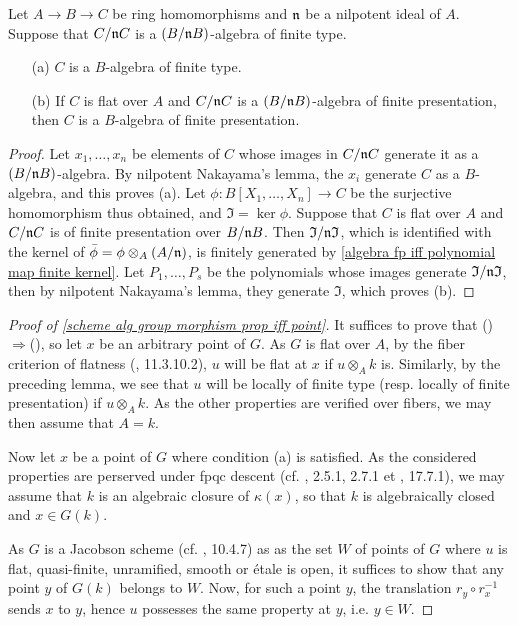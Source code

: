 \begin{lemma}\label{ring homomorphism ft and fp after nilpotent quotient}
Let $A\to B\to C$ be ring homomorphisms and $\mathfrak{n}$ be a nilpotent ideal of $A$. Suppose that $C/\mathfrak{n} C$ is a $(B/\mathfrak{n} B)$-algebra of finite type.
\begin{enumerate}
    \item[(a)] $C$ is a $B$-algebra of finite type.
    \item[(b)] If $C$ is flat over $A$ and $C/\mathfrak{n} C$ is a $(B/\mathfrak{n} B)$-algebra of finite presentation, then $C$ is a $B$-algebra of finite presentation.
\end{enumerate}
\end{lemma}
\begin{proof}
Let $x_1,\dots,x_n$ be elements of $C$ whose images in $C/\mathfrak{n} C$ generate it as a $(B/\mathfrak{n} B)$-algebra. By nilpotent Nakayama's lemma, the $x_i$ generate $C$ as a $B$-algebra, and this proves (a). Let $\phi:B[X_1,\dots,X_n]\to C$ be the surjective homomorphism thus obtained, and $\mathfrak{I}=\ker\phi$. Suppose that $C$ is flat over $A$ and $C/\mathfrak{n} C$ is of finite presentation over $B/\mathfrak{n} B$. Then $\mathfrak{I}/\mathfrak{n}\mathfrak{I}$, which is identified with the kernel of $\bar{\phi}=\phi\otimes_A(A/\mathfrak{n})$, is finitely generated by \cref{algebra fp iff polynomial map finite kernel}. Let $P_1,\dots,P_s$ be the polynomials whose images generate $\mathfrak{I}/\mathfrak{n}\mathfrak{I}$, then by nilpotent Nakayama's lemma, they generate $\mathfrak{I}$, which proves (b).
\end{proof}

\begin{proof}[Proof of \cref{scheme alg group morphism prop iff point}]
It suffices to prove that ()$\Rightarrow$(), so let $x$ be an arbitrary point of $G$. As $G$ is flat over $A$, by the fiber criterion of flatness (\cite{EGA4-3}, 11.3.10.2), $u$ will be flat at $x$ if $u\otimes_Ak$ is. Similarly, by the preceding lemma, we see that $u$ will be locally of finite type (resp. locally of finite presentation) if $u\otimes_Ak$. As the other properties are verified over fibers, we may then assume that $A=k$.\par
Now let $x$ be a point of $G$ where condition (a) is satisfied. As the considered properties are perserved under fpqc descent (cf. \cite{EGA4-2}, 2.5.1, 2.7.1 et \cite{EGA4-4}, 17.7.1), we may assume that $k$ is an algebraic closure of $\kappa(x)$, so that $k$ is algebraically closed and $x\in G(k)$.\par
As $G$ is a Jacobson scheme (cf. \cite{EGA4-3}, 10.4.7) as as the set $W$ of points of $G$ where $u$ is flat, quasi-finite, unramified, smooth or \'etale is open, it suffices to show that any point $y$ of $G(k)$ belongs to $W$. Now, for such a point $y$, the translation $r_y\circ r_x^{-1}$ sends $x$ to $y$, hence $u$ possesses the same property at $y$, i.e. $y\in W$. 
\end{proof}

